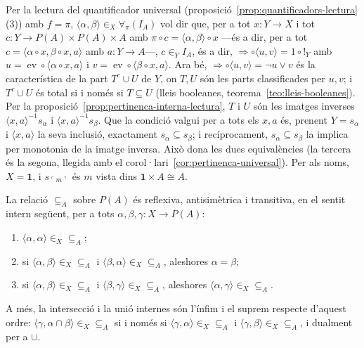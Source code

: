 \begin{prova}
Per la lectura del quantificador universal
(proposició~\ref{prop:quantificadors-lectura}(3)) amb \(f=\pi\),
\(\langle\alpha,\beta\rangle\in_X\forall_\pi(I_A)\) vol dir que, per a tot
\(x\colon Y\to X\) i tot \(c\colon Y\to P(A)\times P(A)\times A\) amb
\(\pi\circ c=\langle\alpha,\beta\rangle\circ x\) ---és a dir, per a tot
\(c=\langle\alpha\circ x,\beta\circ x,a\rangle\) amb \(a\colon Y\to A\)---,
\(c\in_YI_A\), és a dir,
\(\Rightarrow\circ\langle u,v\rangle=1\circ{!}_Y\) amb
\(u=\operatorname{ev}\circ\langle\alpha\circ x,a\rangle\) i
\(v=\operatorname{ev}\circ\langle\beta\circ x,a\rangle\). Ara bé,
\(\Rightarrow\circ\langle u,v\rangle=\neg u\vee v\) és la característica
de la part \(T^c\cup U\) de \(Y\), on \(T,U\) són les parts classificades
per \(u,v\); i \(T^c\cup U\) és total si i només si \(T\subseteq U\)
(lleis booleanes, teorema~\ref{teo:lleis-booleanes}). Per la
proposició~\ref{prop:pertinenca-interna-lectura}, \(T\) i \(U\) són les
imatges inverses \(\langle x,a\rangle^{-1}s_\alpha\) i
\(\langle x,a\rangle^{-1}s_\beta\). Que la condició valgui per a tots els
\(x,a\) és, prenent \(Y=s_\alpha\) i \(\langle x,a\rangle\) la seva
inclusió, exactament \(s_\alpha\subseteq s_\beta\); i recíprocament,
\(s_\alpha\subseteq s_\beta\) la implica per monotonia de la imatge
inversa. Això dona les dues equivalències (la tercera és la segona,
llegida amb el corol·lari~\ref{cor:pertinenca-universal}). Per als noms,
\(X=\mathbf1\), i \(s_{\ulcorner m\urcorner}\) és \(m\) vista dins
\(\mathbf1\times A\cong A\).
\end{prova}

\begin{teorema}\label{teo:inclusio-ordre}
La relació \(\subseteq_A\) sobre \(P(A)\) és reflexiva, antisimètrica i
transitiva, en el sentit intern següent, per a tots
\(\alpha,\beta,\gamma\colon X\to P(A)\):
\begin{enumerate}
\item \(\langle\alpha,\alpha\rangle\in_X{\subseteq_A}\);
\item si \(\langle\alpha,\beta\rangle\in_X{\subseteq_A}\) i
\(\langle\beta,\alpha\rangle\in_X{\subseteq_A}\), aleshores
\(\alpha=\beta\);
\item si \(\langle\alpha,\beta\rangle\in_X{\subseteq_A}\) i
\(\langle\beta,\gamma\rangle\in_X{\subseteq_A}\), aleshores
\(\langle\alpha,\gamma\rangle\in_X{\subseteq_A}\).
\end{enumerate}
A més, la intersecció i la unió internes són l'ínfim i el suprem respecte
d'aquest ordre: \(\langle\gamma,\alpha\cap\beta\rangle\in_X{\subseteq_A}\)
si i només si \(\langle\gamma,\alpha\rangle\in_X{\subseteq_A}\) i
\(\langle\gamma,\beta\rangle\in_X{\subseteq_A}\), i dualment per a
\(\cup\).
\end{teorema}

